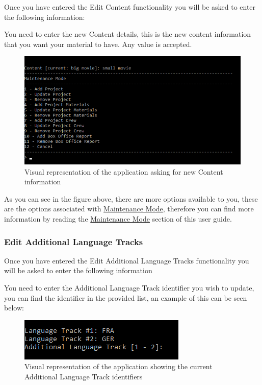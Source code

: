 \documentclass[
  english,
  a4paper,
,tablecaptionabove
]{scrartcl}
\begin{document}
Once you have entered the Edit Content functionality you will be asked
to enter the following information:

You need to enter the new Content details, this is the new content
information that you want your material to have. Any value is accepted.

\begin{figure}
\centering
\includegraphics{images/user-guide/maintenance-mode/update-project-material-content.png}
\caption{Visual representation of the application asking for new Content
information}
\end{figure}

As you can see in the figure above, there are more options available to
you, these are the options associated with
\protect\hyperlink{using-maintenance-mode}{Maintenance Mode}, therefore
you can find more information by reading the
\protect\hyperlink{using-maintenance-mode}{Maintenance Mode} section of
this user guide.

\newpage

\hypertarget{edit-additional-language-tracks-1}{%
\subsubsection{Edit Additional Language
Tracks}\label{edit-additional-language-tracks-1}}

Once you have entered the Edit Additional Language Tracks functionality
you will be asked to enter the following information

You need to enter the Additional Language Track identifier you wish to
update, you can find the identifier in the provided list, an example of
this can be seen below:

\begin{figure}
\centering
\includegraphics{images/user-guide/maintenance-mode/update-project-material-additional-language-track-select-id.png}
\caption{Visual representation of the application showing the current
Additional Language Track identifiers}
\end{figure}
\end{document}
